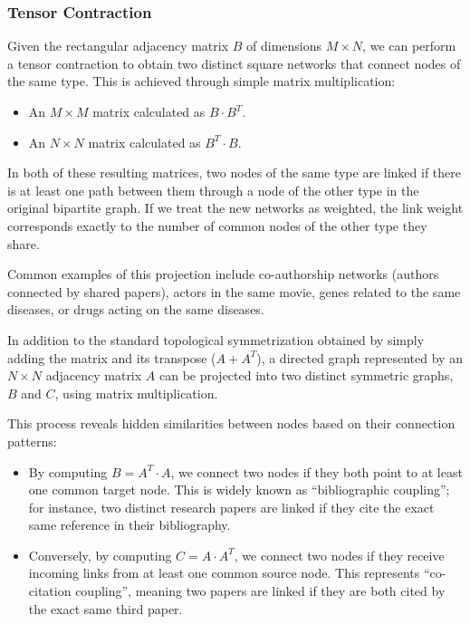\subsubsection{Tensor Contraction}
Given the rectangular adjacency matrix $B$ of dimensions $M \times N$, we can perform a tensor contraction to obtain two distinct square networks that connect nodes of the same type. This is achieved through simple matrix multiplication:
\begin{itemize}
    \item An $M \times M$ matrix calculated as $B \cdot B^T$.
    \item An $N \times N$ matrix calculated as $B^T \cdot B$.
\end{itemize}

In both of these resulting matrices, two nodes of the same type are linked if there is at least one path between them through a node of the other type in the original bipartite graph. If we treat the new networks as weighted, the link weight corresponds exactly to the number of common nodes of the other type they share.

Common examples of this projection include co-authorship networks (authors connected by shared papers), actors in the same movie, genes related to the same diseases, or drugs acting on the same diseases.

\begin{remark}
    In addition to the standard topological symmetrization obtained by simply adding the matrix and its transpose ($A + A^T$), a directed graph represented by an $N \times N$ adjacency matrix $A$ can be projected into two distinct symmetric graphs, $B$ and $C$, using matrix multiplication.

    This process reveals hidden similarities between nodes based on their connection patterns:
    \begin{itemize}
        \item By computing \textbf{$B = A^T \cdot A$}, we connect two nodes if they both point to at least one common target node. This is widely known as ``bibliographic coupling''; for instance, two distinct research papers are linked if they cite the exact same reference in their bibliography.
        \item Conversely, by computing \textbf{$C = A \cdot A^T$}, we connect two nodes if they receive incoming links from at least one common source node. This represents ``co-citation coupling'', meaning two papers are linked if they are both cited by the exact same third paper.
    \end{itemize}
\end{remark}


